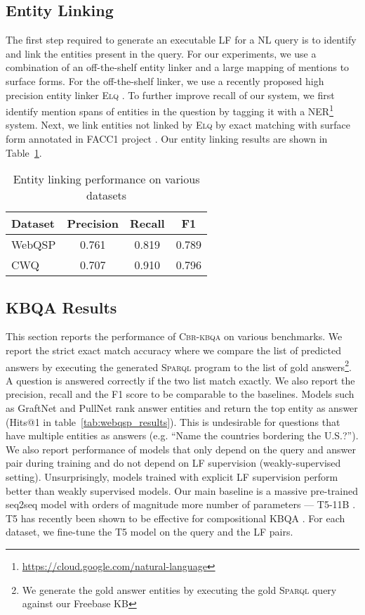 \documentclass[11pt]{article}
\newcommand{\spql}{\textsc{Sparql}\xspace}
\newcommand{\alg}{\textsc{Cbr-kbqa}\xspace}
\begin{document}
\subsection{Entity Linking}
\label{sub:entity_linking}
The first step required to generate an executable LF for a NL query is to identify and link the entities present in the query. For our experiments, we use a combination of an off-the-shelf entity linker and a large mapping of mentions to surface forms. For the off-the-shelf linker, we use a recently proposed high precision entity linker \textsc{Elq} \cite{li2020efficient}. To further improve recall of our system, we first identify mention spans of entities in the question by tagging it with a NER\footnote{\url{https://cloud.google.com/natural-language}} system. Next, we link entities not linked by \textsc{Elq} by exact matching with surface form annotated in FACC1 project \cite{facc1}. Our entity linking results are shown in Table~\ref{tab:el_results}.
\begin{table}[]
    \centering
    \small
    \begin{tabular}{@{}l c c c@{}}
    \toprule
    Dataset &  Precision & Recall & F1\\\midrule
    WebQSP  & 0.761   & 0.819 & 0.789\\
    CWQ & 0.707 & 0.910 & 0.796\\\bottomrule
    \end{tabular}
    \caption{Entity linking performance on various datasets}
    \label{tab:el_results}
    \vspace{-1em}
\end{table}


\subsection{KBQA Results}
\label{sub:main_results}
This section reports the performance of \alg on various benchmarks. We report the strict exact match accuracy where we compare the list of predicted answers by executing the generated \spql program to the list of gold answers\footnote{We generate the gold answer entities by executing the gold \spql query against our Freebase KB}. A question is answered correctly if the two list match exactly. We also report the precision, recall and the F1 score to be comparable to the baselines. Models such as GraftNet \cite{sun2018open} and PullNet \cite{sun2019pullnet} rank answer entities and return the top entity as answer (Hits@1 in table~\ref{tab:webqsp_results}). This is undesirable for questions that have multiple entities as answers (e.g. ``Name the countries bordering the U.S.?''). We also report performance of models that only depend on the query and answer pair during training and do not depend on LF supervision (weakly-supervised setting). Unsurprisingly, models trained with explicit LF supervision perform better than weakly supervised models. Our main baseline is a massive pre-trained seq2seq model with orders of magnitude more number of parameters --- T5-11B \cite{t5}. T5 has recently been shown to be effective for compositional KBQA \cite{furrer2020compositional}. For each dataset, we fine-tune the T5 model on the query and the LF pairs. 
\end{document}
